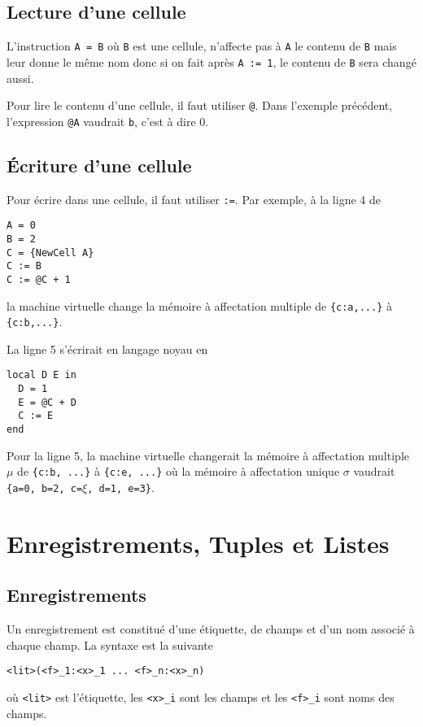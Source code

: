 \subsection{Lecture d'une cellule}
L'instruction
\lstinline|A = B|
où \lstinline|B| est une cellule,
n'affecte pas à \lstinline|A| le contenu de \lstinline|B| mais leur donne
le même nom donc si on fait après \lstinline|A := 1|,
le contenu de \lstinline|B| sera changé aussi.

Pour lire le contenu d'une cellule, il faut utiliser \lstinline|@|.
Dans l'exemple précédent, l'expression \lstinline|@A| vaudrait \lstinline|b|,
c'est à dire 0.

\subsection{Écriture d'une cellule}
Pour écrire dans une cellule, il faut utiliser \lstinline|:=|.
Par exemple, à la ligne 4 de
\begin{lstlisting}
A = 0
B = 2
C = {NewCell A}
C := B
C := @C + 1
\end{lstlisting}
la machine virtuelle change la mémoire à affectation multiple
de \lstinline|{c:a,...}| à \lstinline|{c:b,...}|.

La ligne 5 s'écrirait en langage noyau en
\begin{lstlisting}
local D E in
  D = 1
  E = @C + D
  C := E
end
\end{lstlisting}
Pour la ligne 5, la machine virtuelle changerait la mémoire
à affectation multiple $\mu$ de
\lstinline|{c:b, ...}| à \lstinline|{c:e, ...}| où la mémoire
à affectation unique $\sigma$ vaudrait
\lstinline|{a=0, b=2, c=|$\xi$\lstinline|, d=1, e=3}|.


\section{Enregistrements, Tuples et Listes}
\subsection{Enregistrements}
Un enregistrement est constitué d'une étiquette, de champs et
d'un nom associé à chaque champ.
La syntaxe est la suivante
\begin{lstlisting}
<lit>(<f>_1:<x>_1 ... <f>_n:<x>_n)
\end{lstlisting}
où \lstinline|<lit>| est l'étiquette,
les \lstinline|<x>_i| sont les champs et
les \lstinline|<f>_i| sont noms des champs.

